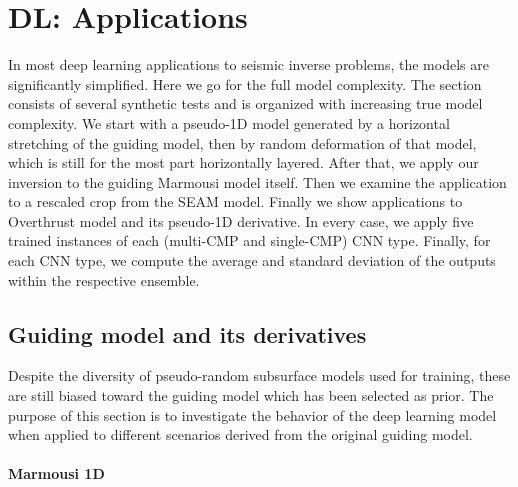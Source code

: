 \documentclass[manuscript]{geophysics}
\begin{document}
\section{DL: Applications}
In most deep learning applications to seismic inverse problems, the models are significantly simplified. Here we go for the full model complexity. The section consists of several synthetic tests and is organized with increasing true model complexity. We start with a pseudo-1D model generated by a horizontal stretching of the guiding model, then by random deformation of that model, which is still for the most part horizontally layered. After that, we apply our inversion to the guiding Marmousi model itself. Then we examine the application to a rescaled crop from the SEAM model. Finally we show applications to Overthrust model and its pseudo-1D derivative. In every case, we apply five trained instances of each (multi-CMP and single-CMP) CNN type. Finally, for each CNN type, we compute the average and standard deviation of the outputs within the respective ensemble.


\subsection{Guiding model and its derivatives}

Despite the diversity of pseudo-random subsurface models used for training, these are still biased toward the guiding model which has been selected as prior. The purpose of this section is to investigate the behavior of the deep learning model when applied to different scenarios derived from the original guiding model.

\paragraph{Marmousi 1D}
\newcommand{\modelFname}{marmvel1D}
\end{document}
